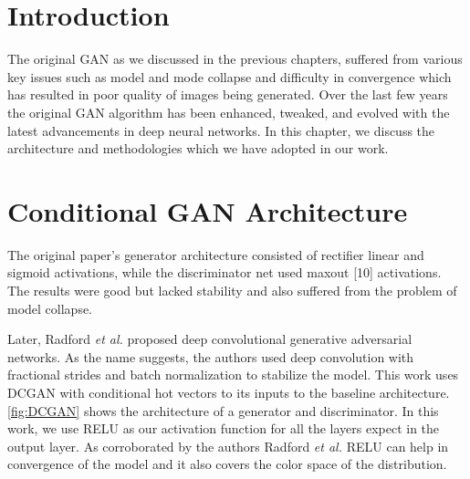 \doublespacing
{}
\label{chap:EGAN}
\section{Introduction}
The original GAN as we discussed in the previous chapters, suffered from various key issues such as model and mode collapse and difficulty in convergence which has resulted in poor quality of images being generated. Over the last few years the original GAN algorithm has been enhanced, tweaked, and evolved  with the latest advancements in deep neural networks. In this chapter, we discuss the architecture and methodologies which we have adopted in our work.  


\section{Conditional GAN Architecture} 
The original paper's \cite{Original-GAN} generator architecture consisted of rectifier linear \cite{RELU} and sigmoid activations, while the discriminator net used maxout [10] activations. The results were good but lacked stability and also suffered from the problem of model collapse.
\par
Later, Radford \textit{et al.} \cite{DCGAN} proposed deep convolutional generative adversarial networks. As the name suggests, the authors used deep convolution with fractional strides and batch normalization to stabilize the model. This work uses DCGAN with conditional hot vectors to its inputs to the baseline architecture. \cref{fig:DCGAN} shows the architecture of a generator and discriminator. In this work, we use RELU as our activation function for all the layers expect in the output layer. As corroborated by the authors Radford \textit{et al.} \cite{DCGAN} RELU can help in convergence of the model and it also covers the color space of the distribution.
